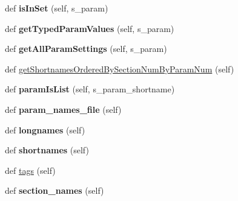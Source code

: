 \begin{DoxyCompactItemize}
\item 
def {\bfseries is\+In\+Set} (self, s\+\_\+param)\hypertarget{classnegui_1_1pgparamset_1_1PGParamSet_a1f21b48a029f7b0e92d5c3d149c76f71}{}\label{classnegui_1_1pgparamset_1_1PGParamSet_a1f21b48a029f7b0e92d5c3d149c76f71}

\item 
def {\bfseries get\+Typed\+Param\+Values} (self, s\+\_\+param)\hypertarget{classnegui_1_1pgparamset_1_1PGParamSet_a9818e23b68062428362339c0ca6f47cd}{}\label{classnegui_1_1pgparamset_1_1PGParamSet_a9818e23b68062428362339c0ca6f47cd}

\item 
def {\bfseries get\+All\+Param\+Settings} (self, s\+\_\+param)\hypertarget{classnegui_1_1pgparamset_1_1PGParamSet_a1174515aada4f5fe5f12625caf9d8079}{}\label{classnegui_1_1pgparamset_1_1PGParamSet_a1174515aada4f5fe5f12625caf9d8079}

\item 
def \hyperlink{classnegui_1_1pgparamset_1_1PGParamSet_a4f1aab0d1de87fbf66ea057e3577804c}{get\+Shortnames\+Ordered\+By\+Section\+Num\+By\+Param\+Num} (self)
\item 
def {\bfseries param\+Is\+List} (self, s\+\_\+param\+\_\+shortname)\hypertarget{classnegui_1_1pgparamset_1_1PGParamSet_aced5db45f2ca24451e6a72348158d1d8}{}\label{classnegui_1_1pgparamset_1_1PGParamSet_aced5db45f2ca24451e6a72348158d1d8}

\item 
def {\bfseries param\+\_\+names\+\_\+file} (self)\hypertarget{classnegui_1_1pgparamset_1_1PGParamSet_a8d8478fc187d4c04e3a3c1093f7834be}{}\label{classnegui_1_1pgparamset_1_1PGParamSet_a8d8478fc187d4c04e3a3c1093f7834be}

\item 
def {\bfseries longnames} (self)\hypertarget{classnegui_1_1pgparamset_1_1PGParamSet_a27bf393c0d8052647b19eac34495f06b}{}\label{classnegui_1_1pgparamset_1_1PGParamSet_a27bf393c0d8052647b19eac34495f06b}

\item 
def {\bfseries shortnames} (self)\hypertarget{classnegui_1_1pgparamset_1_1PGParamSet_a0418157edbb31cc2282210baca66a35d}{}\label{classnegui_1_1pgparamset_1_1PGParamSet_a0418157edbb31cc2282210baca66a35d}

\item 
def \hyperlink{classnegui_1_1pgparamset_1_1PGParamSet_a292c23c3d6349027f5c19eec70ea34f8}{tags} (self)
\item 
def {\bfseries section\+\_\+names} (self)\hypertarget{classnegui_1_1pgparamset_1_1PGParamSet_a7f03eecfcbbb1d478ea53d2864f0fc82}{}\label{classnegui_1_1pgparamset_1_1PGParamSet_a7f03eecfcbbb1d478ea53d2864f0fc82}

\end{DoxyCompactItemize}
